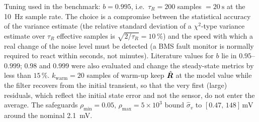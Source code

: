 Tuning used in the benchmark: $b = 0.995$, i.e.\ $\tau_R = 200$ samples $=\SI{20}{\second}$ at the
\SI{10}{\hertz} sample rate.  The choice is a compromise between the statistical accuracy of the
variance estimate (the relative standard deviation of a $\chi^2$-type variance estimate over
$\tau_R$ effective samples is $\sqrt{2/\tau_R}=\SI{10}{\percent}$) and the speed with which a real
change of the noise level must be detected (a BMS fault monitor is normally required to react
within seconds, not minutes).  Literature values for $b$ lie in $0.95$--$0.999$; $0.98$ and $0.999$
were also evaluated and change the steady-state metrics by less than $15\,\%$.
$k_{\text{warm}} = 20$ samples of warm-up keep $\hat{\bm{R}}$ at the model value while the filter
recovers from the initial transient, so that the very first (large) residuals, which reflect the
initial state error and not the sensor, do not enter the average.  The safeguards
$\rho_{\min}=0.05$, $\rho_{\max}=5\times 10^3$ bound $\hat\sigma_v$ to
$[0.47,\,148]\,\si{\milli\volt}$ around the nominal \SI{2.1}{\milli\volt}.

